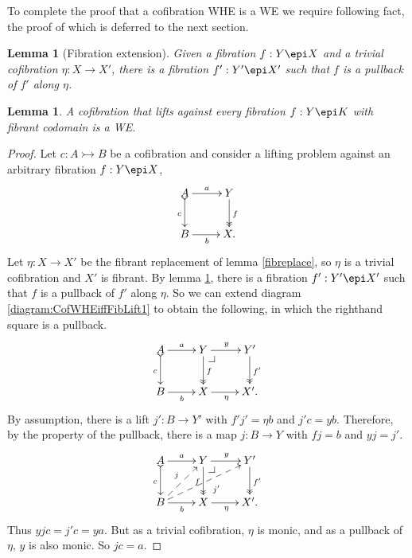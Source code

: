 \documentclass[11pt]{article}
\makeatletter
\newcommand{\pbcorner}[1][dr]{\save*!/#1-1.2pc/#1:(-1,1)@^{|-}\restore}
\newcommand{\mono}{\ensuremath{\rightarrowtail}}
\newcommand{\ra}{\ensuremath{\rightarrow}}
\newtheorem{lemma}[theorem]{Lemma}
\theoremstyle{remark}
\theoremstyle{definition}
\makeatother
\begin{document}
To complete the proof that a cofibration WHE is a WE we require following fact, the proof of which is deferred to the next section.

\begin{lemma}[Fibration extension]\label{lemma:fibextreplace}
Given a fibration $ f : Y \epi X$ and a trivial cofibration $\eta: X\ra X'$,
there is a fibration $f' : Y' \epi X'$ such that $f$ is a pullback of $f'$ along $\eta$. 
\end{lemma}

\begin{lemma}\label{lemma:CofWEiffFibLift}
A cofibration that lifts against every fibration $f : Y\epi K$ with fibrant codomain is a WE.
\end{lemma}

\begin{proof}
Let $c : A\mono B$ be a cofibration and consider a lifting problem against an arbitrary fibration $f: Y\epi X$,
\begin{equation}\label{diagram:CofWHEiffFibLift1}
\xymatrix{
A \ar@{>->}[d]_{c} \ar[r]^-{a}  & Y \ar@{>>}[d]^{f} \\
B \ar[r]_{b} &  X.
}
\end{equation}
Let $\eta: X\ra X'$ be the fibrant replacement of lemma \ref{fibreplace}, so $\eta$ is a trivial cofibration and $X'$ is fibrant. 
By lemma \ref{lemma:fibextreplace}, there is a fibration $f' : Y' \epi X'$ such that $f$ is a pullback of $f'$ along $\eta$. So we can extend diagram \eqref{diagram:CofWHEiffFibLift1} to obtain the following, in which the righthand square is a pullback.
\begin{equation}\label{diagram:CofWHEiffFibLift2}
\xymatrix{
A \ar@{>->}[d]_{c} \ar[r]^-{a}  & Y \ar@{>>}[d]^{f} {\pbcorner} \ar[r]^{y} & Y' \ar@{>>}[d]^{f'} \\
B \ar[r]_{b} &  X  \ar[r]_\eta &  X'.
}
\end{equation}
By assumption, there is a lift $j' : B\ra Y'$ with $f' j' = \eta b$ and $j'c = yb$.  Therefore, by the property of the pullback, there is a map $j : B\ra Y$ with $fj = b$ and $y j = j'$.  
\begin{equation}\label{diagram:CofWHEiffFibLift2}
\xymatrix{
A \ar@{>->}[d]_{c} \ar[r]^-{a}  & Y \ar@{>>}[d]_{f} {\pbcorner} \ar[r]^{y} & Y' \ar@{>>}[d]^{f'} \\
B \ar[r]_{b} \ar@{-->}[ru]^{j} \ar@{-->}[rru]_{\quad j'} &  X  \ar[r]_\eta &  X'.
}
\end{equation}
Thus $yjc = j'c = ya$.  But as a trivial cofibration, $\eta$ is monic, and as a pullback of $\eta$, $y$ is also monic. So $jc=a$.
\end{proof}
\end{document}
